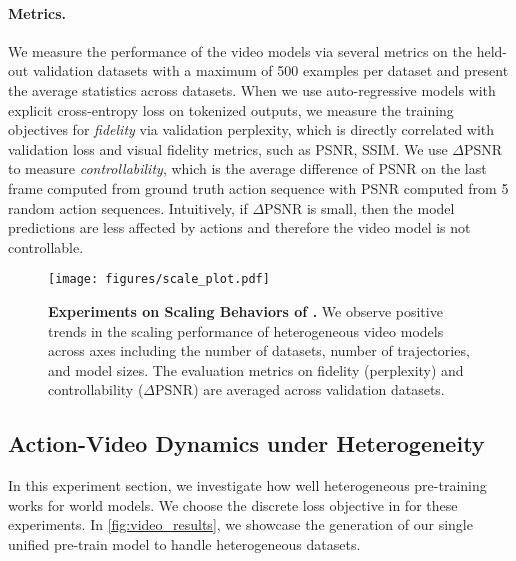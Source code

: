 \paragraph{Metrics.} We measure the performance of the video models via several metrics on the held-out validation datasets with a maximum of 500 examples per dataset and present the average statistics across datasets. When we use auto-regressive models with explicit cross-entropy loss on tokenized outputs, we measure the training objectives for \textit{fidelity} via validation perplexity, which is directly correlated with validation loss and visual fidelity metrics, such as PSNR, SSIM. We use $\Delta$PSNR \cite{bruce2024genie} to measure \textit{controllability}, which is the average difference of PSNR on the last frame computed from ground truth action sequence with PSNR computed from 5 random action sequences. Intuitively, if $\Delta$PSNR is small, then the model predictions are less affected by actions and therefore the video model is not controllable.

\begin{figure*}
    \centering
    \texttt{[image: figures/scale\_plot.pdf]}
    \caption{\textbf{Experiments on Scaling Behaviors of \ourshort.} We observe positive trends in the scaling performance of heterogeneous video models across axes including the number of datasets, number of trajectories, and model sizes. The evaluation metrics on fidelity (perplexity) and controllability ($\Delta$PSNR) are averaged across validation datasets.  }
    \label{fig:pretrain_scaling}
\end{figure*}


\subsection{Action-Video Dynamics under Heterogeneity\label{sec:hma_pretrain}}

In this experiment section, we investigate how well heterogeneous pre-training works for world models. We choose the discrete loss objective in \ourshort for these experiments. In \cref{fig:video_results}, we showcase the generation of our single unified pre-train model \ourshort to handle heterogeneous datasets. 


